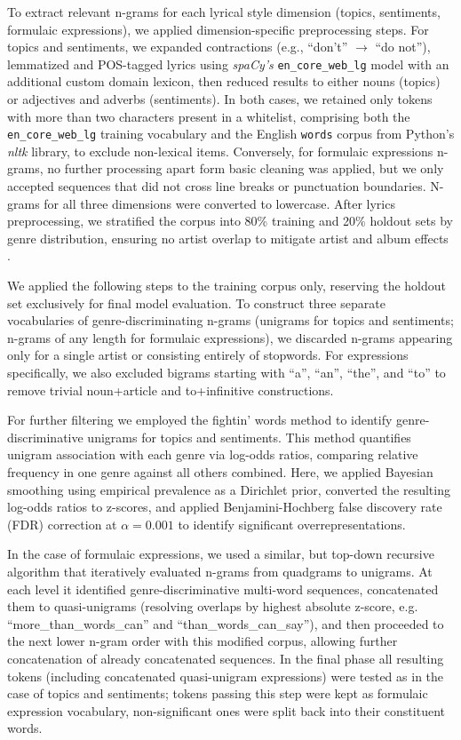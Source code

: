 \documentclass{article}
\begin{document}
To extract relevant n-grams for each lyrical style dimension (topics, sentiments, formulaic expressions), we applied dimension-specific preprocessing steps. For topics and sentiments, we expanded contractions (e.g., ``don't'' $\rightarrow$ ``do not''), lemmatized and POS-tagged lyrics using \textit{spaCy's} \texttt{en\_core\_web\_lg} model with an additional custom domain lexicon, then reduced results to either nouns (topics) or adjectives and adverbs (sentiments). In both cases, we retained only tokens with more than two characters present in a whitelist, comprising both the \texttt{en\_core\_web\_lg} training vocabulary and the English \texttt{words} corpus from Python's \textit{nltk} library, to exclude non-lexical items. Conversely, for formulaic expressions n-grams, no further processing apart form basic cleaning was applied, but we only accepted sequences that did not cross line breaks or punctuation boundaries. N-grams for all three dimensions were converted to lowercase. After lyrics preprocessing, we stratified the corpus into 80\% training and 20\% holdout sets by genre distribution, ensuring no artist overlap to mitigate artist and album effects \cite{flexerEffectsAlbumArtist2010}.

We applied the following steps to the training corpus only, reserving the holdout set exclusively for final model evaluation. To construct three separate vocabularies of genre-discriminating n-grams (unigrams for topics and sentiments; n-grams of any length for formulaic expressions), we discarded n-grams appearing only for a single artist or consisting entirely of stopwords. For expressions specifically, we also excluded bigrams starting with ``a'', ``an'', ``the'', and ``to'' to remove trivial noun+article and to+infinitive constructions.

For further filtering we employed the fightin' words method \cite{monroeFightinWordsLexical2017} to identify genre-discriminative unigrams for topics and sentiments. This method quantifies unigram association with each genre via log-odds ratios, comparing relative frequency in one genre against all others combined. Here, we applied Bayesian smoothing using empirical prevalence as a Dirichlet prior, converted the resulting log-odds ratios to z-scores, and applied Benjamini-Hochberg false discovery rate (FDR) correction \cite{benjaminiControllingFalseDiscovery1995} at $\alpha = 0.001$ to identify significant overrepresentations.

In the case of formulaic expressions, we used a similar, but top-down recursive algorithm that iteratively evaluated n-grams from quadgrams to unigrams. At each level it identified genre-discriminative multi-word sequences, concatenated them to quasi-unigrams (resolving overlaps by highest absolute z-score, e.g. ``more\_than\_words\_can'' and ``than\_words\_can\_say''), and then proceeded to the next lower n-gram order with this modified corpus, allowing further concatenation of already concatenated sequences. In the final phase all resulting tokens (including concatenated quasi-unigram expressions) were tested as in the case of topics and sentiments; tokens passing this step were kept as formulaic expression vocabulary, non-significant ones were split back into their constituent words. 
\end{document}
